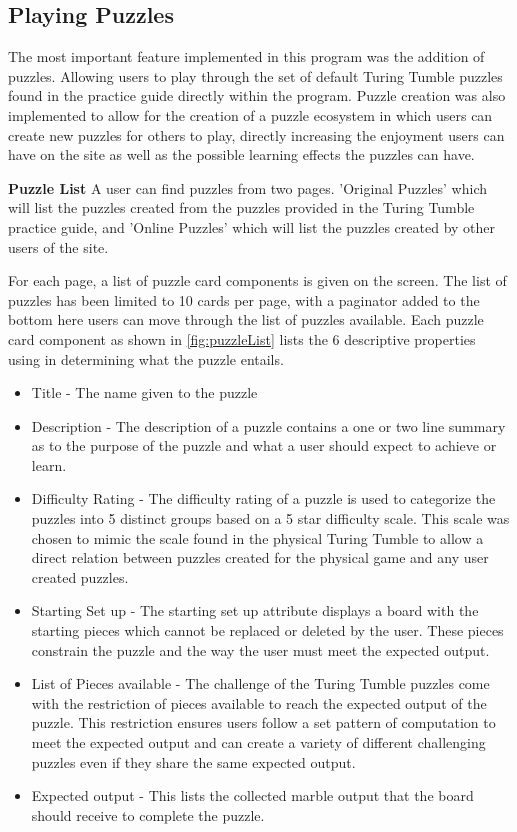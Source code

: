 \documentclass{l4proj}
\begin{document}
\subsection{Playing Puzzles}
The most important feature implemented in this program was the addition of puzzles. Allowing users to play through the set of default Turing Tumble puzzles found in the practice guide directly within the program. Puzzle creation was also implemented to allow for the creation of a puzzle ecosystem in which users can create new puzzles for others to play, directly increasing the enjoyment users can have on the site as well as the possible learning effects the puzzles can have.

\textbf{Puzzle List}
A user can find puzzles from two pages. 'Original Puzzles' which will list the puzzles created from the puzzles provided in the Turing Tumble practice guide, and 'Online Puzzles' which will list the puzzles created by other users of the site.

For each page, a list of puzzle card components is given on the screen. The list of puzzles has been limited to 10 cards per page, with a paginator added to the bottom  here users can move through the list of puzzles available. Each puzzle card component as shown in \ref{fig:puzzleList} lists the 6 descriptive properties using in determining what the puzzle entails. 
\begin{itemize}
    \item Title - The name given to the puzzle
    \item Description - The description of a puzzle contains a one or two line summary as to the purpose of the puzzle and what a user should expect to achieve or learn.
    \item Difficulty Rating - The difficulty rating of a puzzle is used to categorize the puzzles into 5 distinct groups based on a 5 star difficulty scale. This scale was chosen to mimic the scale found in the physical Turing Tumble to allow a direct relation between puzzles created for the physical game and any user created puzzles.
    \item Starting Set up - The starting set up attribute displays a board with the starting pieces which cannot be replaced or deleted by the user. These pieces constrain the puzzle and the way the user must meet the expected output. 
    \item List of Pieces available - The challenge of the Turing Tumble puzzles come with the restriction of pieces available to reach the expected output of the puzzle. This restriction ensures users follow a set pattern of computation to meet the expected output and can create a variety of different challenging puzzles even if they share the same expected output.
    \item Expected output - This lists the collected marble output that the board should receive to complete the puzzle.
\end{itemize}
 
\end{document}
